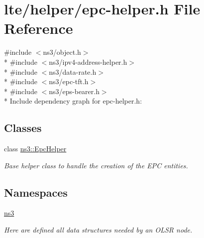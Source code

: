 \hypertarget{epc-helper_8h}{}\section{lte/helper/epc-\/helper.h File Reference}
\label{epc-helper_8h}
{\ttfamily \#include $<$ns3/object.\+h$>$}\\*
{\ttfamily \#include $<$ns3/ipv4-\/address-\/helper.\+h$>$}\\*
{\ttfamily \#include $<$ns3/data-\/rate.\+h$>$}\\*
{\ttfamily \#include $<$ns3/epc-\/tft.\+h$>$}\\*
{\ttfamily \#include $<$ns3/eps-\/bearer.\+h$>$}\\*
Include dependency graph for epc-\/helper.h\+:
\subsection*{Classes}
\begin{DoxyCompactItemize}
\item 
class \hyperlink{classns3_1_1EpcHelper}{ns3\+::\+Epc\+Helper}
\begin{DoxyCompactList}\small\item\em Base helper class to handle the creation of the E\+PC entities. \end{DoxyCompactList}\end{DoxyCompactItemize}
\subsection*{Namespaces}
\begin{DoxyCompactItemize}
\item 
 \hyperlink{namespacens3}{ns3}
\begin{DoxyCompactList}\small\item\em Here are defined all data structures needed by an O\+L\+SR node. \end{DoxyCompactList}\end{DoxyCompactItemize}
